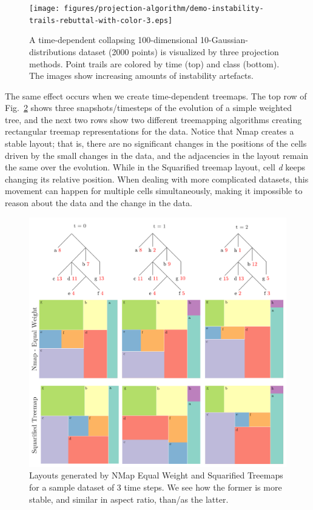 \begin{figure}[h]
    \centering
    \texttt{[image: figures/projection-algorithm/demo-instability-trails-rebuttal-with-color-3.eps]}
    \caption{A time-dependent collapsing 100-dimensional 10-Gaussian-distributions dataset (2000 points) is visualized by three projection methods. Point trails are colored by time (top) and class (bottom). The images show increasing amounts of instability artefacts.}
    \label{fig:intro-pj-demo-instability}
\end{figure}

The same effect occurs when we create time-dependent treemaps. The top row of Fig.~\ref{fig:intro-tm-demo-instability} shows three snapshots/timesteps of the evolution of a simple weighted tree, and the next two rows show two different treemapping algorithms creating rectangular treemap representations for the data.
Notice that Nmap creates a stable layout; that is, there are no significant changes in the positions of the cells driven by the small changes in the data, and the adjacencies in the layout remain the same over the evolution.
While in the Squarified treemap layout, cell \emph{d} keeps changing its relative position. When dealing with more complicated datasets, this movement can happen for multiple cells simultaneously, making it impossible to reason about the data and the change in the data.

\begin{figure}[h]
    \centering
    \includegraphics[width=\linewidth]{figures/intro/mov_sub_new.png}
    \caption{Layouts generated by NMap Equal Weight and Squarified Treemaps for a sample dataset
    of 3 time steps. We see how the former is more stable, and similar in aspect ratio, than/as the
    latter.}
    \label{fig:intro-tm-demo-instability}
\end{figure}

